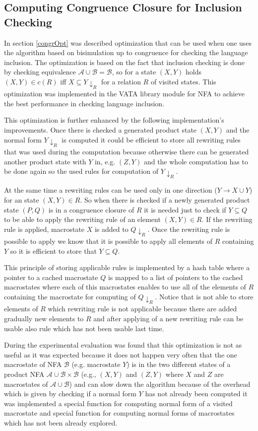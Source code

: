 \subsection{Computing Congruence Closure for Inclusion Checking}
In section \ref{congrOpt} was described optimization that can be used when one uses the algorithm based on bisimulation up to congruence for checking 
the language inclusion. The optimization is based on the fact that inclusion checking is done by checking equivalence $\mathcal{A}\cup\mathcal{B}=\mathcal{B}$,
so for a state $(X,Y)$ holds $(X,Y)\in c(R)$ iff $X\subseteq Y{\downarrow_R}$ for a relation $R$ of visited states. 
This optimization was implemented in the VATA library module for NFA to achieve the best performance in checking language inclusion.

This optimization is further enhanced by the following implementation's improvements. Once there is checked a generated product state $(X,Y)$ and the normal form 
$Y{\downarrow_R}$ is computed it could be efficient to store all rewriting rules that was used during the computation because otherwise there can be
generated another product state with $Y$ in, e.g. $(Z,Y)$ and the whole computation has to be done again so the used rules for computation of $Y{\downarrow_R}$. 

At the same time a rewriting rules can be used only in one direction ($Y\rightarrow X\cup Y$) for an state $(X,Y)\in R$. So when there is checked
if a newly generated product state $(P,Q)$ is in a congruence closure of $R$ it is needed just to check if $Y \subseteq Q$ to be able to apply 
the rewriting rule of an element $(X,Y)\in R$. If the rewriting rule is applied, macrostate $X$ is added to $Q{\downarrow_R}$. 
Once the rewriting rule is possible to apply we know that it is possible to apply all elements of $R$ containing $Y$ 
so it is efficient to store that $Y\subseteq Q$.

This principle of storing applicable rules is implemented by a hash table where a pointer to a cached macrostate $Q$ is mapped to
a list of pointers to the cached macrostates where each of this macrostates enables to use all of the elements of $R$ containing the macrostate
for computing of $Q{\downarrow_R}$.
Notice that is not able to store elements of $R$ which rewriting rule is not applicable because there are added gradually
new elements to $R$ and after applying of a new rewriting rule can be usable also rule which has not been usable last time.%

During the experimental evaluation was found that this optimization is not as useful as it was expected because it does not happen very often that the one
macrostate of NFA $\mathcal{B}$ (e.g. macrostate $Y$) is in the two different states of a product NFA $\mathcal{A}\cup\mathcal{B}\times\mathcal{B}$ (e.g., $(X,Y)$
and $(Z,Y)$ where $X$ and $Z$ are macrostates of $\mathcal{A}\cup\mathcal{B}$) and can slow down the algorithm because of the overhead which is given by checking
if a normal form $Y$ has not already been computed it was implemented a special function for computing normal form of a visited macrostate 
and special function for computing normal forms of macrostates which has not been already explored. 

